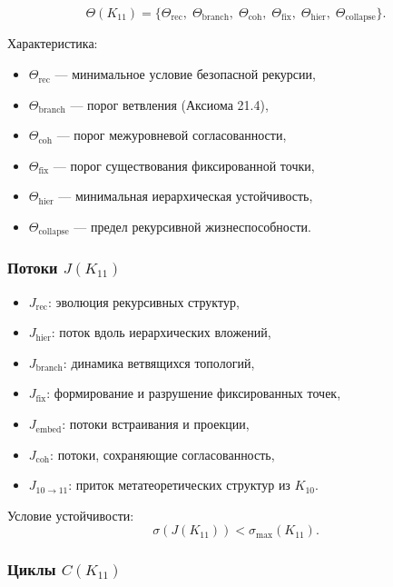 \[
\Theta(K_{11})=
\{
\Theta_{\mathrm{rec}},\;
\Theta_{\mathrm{branch}},\;
\Theta_{\mathrm{coh}},\;
\Theta_{\mathrm{fix}},\;
\Theta_{\mathrm{hier}},\;
\Theta_{\mathrm{collapse}}
\}.
\]

Характеристика:
\begin{itemize}
    \item $\Theta_{\mathrm{rec}}$ — минимальное условие безопасной рекурсии,
    \item $\Theta_{\mathrm{branch}}$ — порог ветвления (Аксиома 21.4),
    \item $\Theta_{\mathrm{coh}}$ — порог межуровневой согласованности,
    \item $\Theta_{\mathrm{fix}}$ — порог существования фиксированной точки,
    \item $\Theta_{\mathrm{hier}}$ — минимальная иерархическая устойчивость,
    \item $\Theta_{\mathrm{collapse}}$ — предел рекурсивной жизнеспособности.
\end{itemize}

\subsubsection{Потоки $J(K_{11})$}

\begin{itemize}
    \item $J_{\mathrm{rec}}$: эволюция рекурсивных структур,
    \item $J_{\mathrm{hier}}$: поток вдоль иерархических вложений,
    \item $J_{\mathrm{branch}}$: динамика ветвящихся топологий,
    \item $J_{\mathrm{fix}}$: формирование и разрушение фиксированных точек,
    \item $J_{\mathrm{embed}}$: потоки встраивания и проекции,
    \item $J_{\mathrm{coh}}$: потоки, сохраняющие согласованность,
    \item $J_{10\to11}$: приток метатеоретических структур из $K_{10}$.
\end{itemize}

Условие устойчивости:
\[
\sigma(J(K_{11})) < \sigma_{\max}(K_{11}).
\]

\subsubsection{Циклы $C(K_{11})$}

